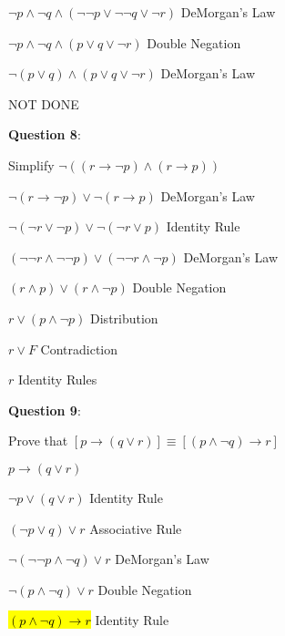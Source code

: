 \documentclass{article} %
\newcommand{\question}[2][]{\begin{flushleft}
        \textbf{Question #1}: \textit{#2}

\end{flushleft}}
\begin{document}
        \tabto{0.98cm}$\neg p \land \neg q \land (\neg \neg p \lor \neg \neg q \lor \neg r)$ \tabto*{5.4cm} DeMorgan's Law

        \tabto{0.98cm}$\neg p \land \neg q \land (p \lor q \lor \neg r)$ \tabto*{5.4cm} Double Negation

        \tabto{0.98cm}$\neg (p \lor q) \land (p \lor q \lor \neg r)$ \tabto*{5.4cm} DeMorgan's Law

        \tabto{0.98cm} NOT DONE

    \question[8]{}

        Simplify $\neg ((r \rightarrow \neg p) \land (r \rightarrow p))$

        \hspace*{0.05cm}

        $\neg(r \rightarrow \neg p) \lor \neg(r \rightarrow p) $ \tabto*{5cm} DeMorgan's Law

        $\neg(\neg r \lor \neg p) \lor \neg( \neg r \lor p) $ \tabto*{5cm} Identity Rule

        $(\neg \neg r \land \neg \neg p) \lor (\neg \neg r \land \neg p) $ \tabto*{5cm} DeMorgan's Law

        $(r \land p) \lor (r \land \neg p)$ \tabto*{5cm} Double Negation \hspace*{2cm}

        $r \lor (p \land \neg p)$ \tabto*{5cm} Distribution

        $r \lor F$ \tabto*{5cm} Contradiction

        $r$ \tabto*{5cm} Identity Rules

    \question[9]{}

        Prove that $[p \rightarrow (q \lor r)] \equiv [(p \land \neg q) \rightarrow r]$

        \hspace{0cm}

        $p \rightarrow (q \lor r)$

        $\neg p \lor (q \lor r)$ \tabto*{3.5cm} Identity Rule
        
        $(\neg p \lor q) \lor r$ \tabto*{3.5cm} Associative Rule

        $\neg (\neg \neg p \land \neg q) \lor r$ \tabto*{3.5cm} DeMorgan's Law

        $\neg (p \land \neg q) \lor r$ \tabto*{3.5cm} Double Negation

        \hl{$(p \land \neg q) \rightarrow r$} \tabto*{3.5cm} Identity Rule

        \hspace{0cm}
\end{document}
